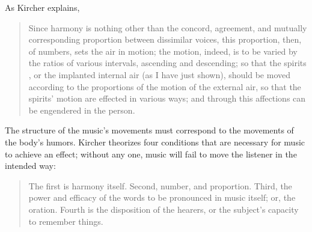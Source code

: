 As Kircher explains, 
\begin{quote}
    Since harmony is nothing other than the concord, agreement, and mutually 
    corresponding proportion between dissimilar voices,
    this proportion, then, of numbers, sets the air in motion;
    the motion, indeed, is to be varied by the ratios of various intervals, 
    ascending and descending;
    so that the spirits , or the implanted 
    internal air (as I have just shown), should be moved according to the 
    proportions of the motion of the external air, so that the spirits' motion are 
    effected in various ways; and through this affections can be engendered in the 
    person.%
        \Autocite
        [552: .]
        {Kircher:Musurgia}
\end{quote}

The structure of the music's movements must correspond to the movements of the 
body's humors.
Kircher theorizes four conditions that are necessary for music to achieve an 
effect; without any one, music will fail to move the listener in the intended 
way:
\begin{quote}
    The first is harmony itself.
    Second, number, and proportion.
    Third, the power and efficacy of the words to be pronounced in music itself; 
    or, the oration.
    Fourth is the disposition of the hearers, or the subject's capacity to 
    remember things.%
    \Autocite
    [550: .]
    {Kircher:Musurgia}
\end{quote}


